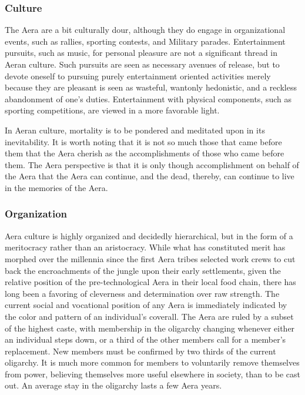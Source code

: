 \subsubsection{Culture}
The Aera are a bit culturally dour, although they do engage in
organizational events, such as rallies, sporting contests, and
Military parades. Entertainment pursuits, such as music, for personal
pleasure are not a significant thread in Aeran culture. Such pursuits
are seen as necessary avenues of release, but to devote oneself to
pursuing purely entertainment oriented activities merely because they
are pleasant is seen as wasteful, wantonly hedonistic, and a reckless
abandonment of one's duties. Entertainment with physical components,
such as sporting competitions, are viewed in a more favorable light.

In Aeran culture, mortality is to be pondered and meditated upon in
its inevitability. It is worth noting that it is not so much those
that came before them that the Aera cherish as the accomplishments of
those who came before them. The Aera perspective is that it is only
though accomplishment on behalf of the Aera that the Aera can
continue, and the dead, thereby, can continue to live in the memories
of the Aera.

\subsubsection{Organization}
Aera culture is highly organized and decidedly hierarchical, but in
the form of a meritocracy rather than an aristocracy. While what has
constituted merit has morphed over the millennia since the first Aera
tribes selected work crews to cut back the encroachments of the jungle
upon their early settlements, given the relative position of the
pre-technological Aera in their local food chain, there has long been
a favoring of cleverness and determination over raw strength. The
current social and vocational position of any Aera is immediately
indicated by the color and pattern of an individual's coverall. The
Aera are ruled by a subset of the highest caste, with membership in
the oligarchy changing whenever either an individual steps down, or a
third of the other members call for a member's replacement. New
members must be confirmed by two thirds of the current oligarchy. It
is much more common for members to voluntarily remove themselves from
power, believing themselves more useful elsewhere in society, than to
be cast out. An average stay in the oligarchy lasts a few Aera years.

